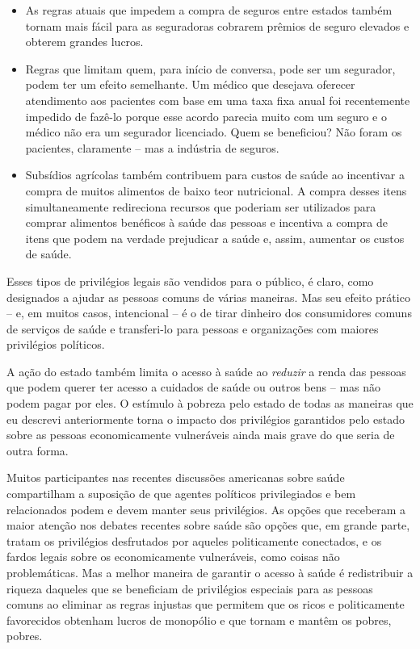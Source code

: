 \begin{itemize}
\item As regras atuais que impedem a compra de seguros entre estados também tornam mais fácil para as seguradoras cobrarem prêmios de seguro elevados e obterem grandes lucros.

\item Regras que limitam quem, para início de conversa, pode ser um segurador, podem ter um efeito semelhante. Um médico que desejava oferecer atendimento aos pacientes com base em uma taxa fixa anual foi recentemente impedido de fazê-lo porque esse acordo parecia muito com um seguro e o médico não era um segurador licenciado. Quem se beneficiou? Não foram os pacientes, claramente -- mas a indústria de seguros.

\item Subsídios agrícolas também contribuem para custos de saúde ao incentivar a compra de muitos alimentos de baixo teor nutricional. A compra desses itens simultaneamente redireciona recursos que poderiam ser utilizados para comprar alimentos benéficos à saúde das pessoas e incentiva a compra de itens que podem na verdade prejudicar a saúde e, assim, aumentar os custos de saúde.
\end{itemize}

Esses tipos de privilégios legais são vendidos para o público, é claro, como designados a ajudar as pessoas comuns de várias maneiras. Mas seu efeito prático -- e, em muitos casos, intencional -- é o de tirar dinheiro dos consumidores comuns de serviços de saúde e transferi-lo para pessoas e organizações com maiores privilégios políticos.

A ação do estado também limita o acesso à saúde ao \emph{reduzir} a renda das pessoas que podem querer ter acesso a cuidados de saúde ou outros bens -- mas não podem pagar por eles. O estímulo à pobreza pelo estado de todas as maneiras que eu descrevi anteriormente torna o impacto dos privilégios garantidos pelo estado sobre as pessoas economicamente vulneráveis ainda mais grave do que seria de outra forma.

Muitos participantes nas recentes discussões americanas sobre saúde compartilham a suposição de que agentes políticos privilegiados e bem relacionados podem e devem manter seus privilégios. As opções que receberam a maior atenção nos debates recentes sobre saúde são opções que, em grande parte, tratam os privilégios desfrutados por aqueles politicamente conectados, e os fardos legais sobre os economicamente vulneráveis, como coisas não problemáticas. Mas a melhor maneira de garantir o acesso à saúde é redistribuir a riqueza daqueles que se beneficiam de privilégios especiais para as pessoas comuns ao eliminar as regras injustas que permitem que os ricos e politicamente favorecidos obtenham lucros de monopólio e que tornam e mantêm os pobres, pobres.

